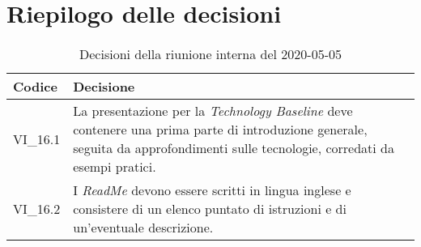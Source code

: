 \section{Riepilogo delle decisioni}
\begin{longtable}{ 
	 >{\centering}p{} >{}p{} }
	
	\caption{Decisioni della riunione interna del 2020-05-05}\\	
	
	\textbf{\color{white}Codice} & 
	\textbf{\color{white}Decisione} 
	\tabularnewline  
	\endhead
	
	VI\_16.1 & La presentazione per la \textit{Technology Baseline}\ped{\textit{G}} deve contenere una prima parte di introduzione generale, seguita da approfondimenti sulle tecnologie, corredati da esempi pratici. \\
	VI\_16.2 & I \textit{ReadMe} devono essere scritti in lingua inglese e consistere di un elenco puntato di istruzioni e di un'eventuale descrizione. \\	

\end{longtable}